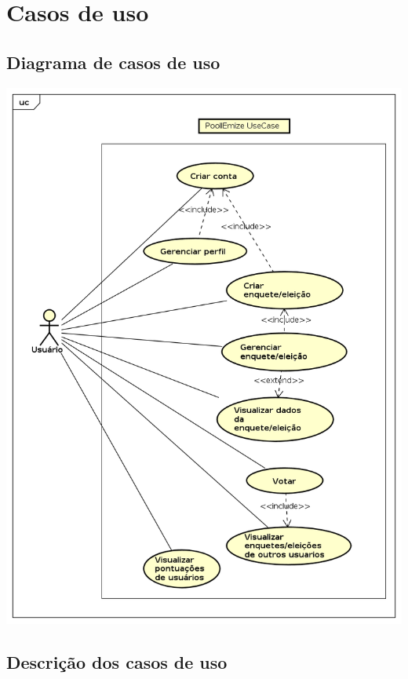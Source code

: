 \documentclass[a4paper,12pt]{report}
\begin{document}
\newpage
\section*{Casos de uso}
\markright{}
\subsection*{Diagrama de casos de uso}
\markright{}
\includegraphics[width=14.3cm]{use_cases/UseCaseDiagram.png}
\newpage
\subsection*{Descrição dos casos de uso}
\markright{}
\end{document}
